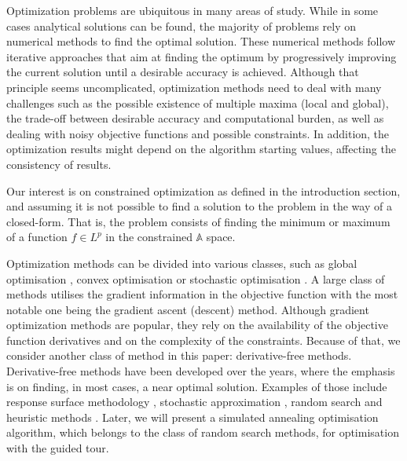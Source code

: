 Optimization problems are ubiquitous in many areas of study. While in
some cases analytical solutions can be found, the majority of problems
rely on numerical methods to find the optimal solution. These numerical
methods follow iterative approaches that aim at finding the optimum by
progressively improving the current solution until a desirable accuracy
is achieved. Although that principle seems uncomplicated, optimization
methods need to deal with many challenges such as the possible existence
of multiple maxima (local and global), the trade-off between desirable
accuracy and computational burden, as well as dealing with noisy
objective functions and possible constraints. In addition, the
optimization results might depend on the algorithm starting values,
affecting the consistency of results.

Our interest is on constrained optimization
\citep{bertsekas2014constrained} as defined in the introduction section,
and assuming it is not possible to find a solution to the problem in the
way of a closed-form. That is, the problem consists of finding the
minimum or maximum of a function \(f \in L^p\) in the constrained
\(\mathbb{A}\) space.

Optimization methods can be divided into various classes, such as global
optimisation \citep{kelley1999iterative, fletcher2013practical}, convex
optimisation \citep{boyd2004convex} or stochastic optimisation
\citep{nocedal2006numerical}. A large class of methods utilises the
gradient information in the objective function with the most notable one
being the gradient ascent (descent) method. Although gradient
optimization methods are popular, they rely on the availability of the
objective function derivatives and on the complexity of the constraints.
Because of that, we consider another class of method in this paper:
derivative-free methods. Derivative-free methods have been developed
over the years, where the emphasis is on finding, in most cases, a near
optimal solution. Examples of those include response surface methodology
\citep{box1951experimental}, stochastic approximation
\citep{robbins1951stochastic}, random search \citep{fu2015handbook} and
heuristic methods \citep{sorensen2013metaheuristics}. Later, we will
present a simulated annealing optimisation algorithm, which belongs to
the class of random search methods, for optimisation with the guided
tour.

